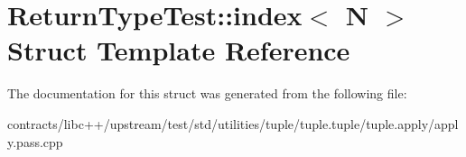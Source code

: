 \hypertarget{struct_return_type_test_1_1index}{}\section{Return\+Type\+Test\+:\+:index$<$ N $>$ Struct Template Reference}
\label{struct_return_type_test_1_1index}


The documentation for this struct was generated from the following file\+:\begin{DoxyCompactItemize}
\item 
contracts/libc++/upstream/test/std/utilities/tuple/tuple.\+tuple/tuple.\+apply/apply.\+pass.\+cpp\end{DoxyCompactItemize}
